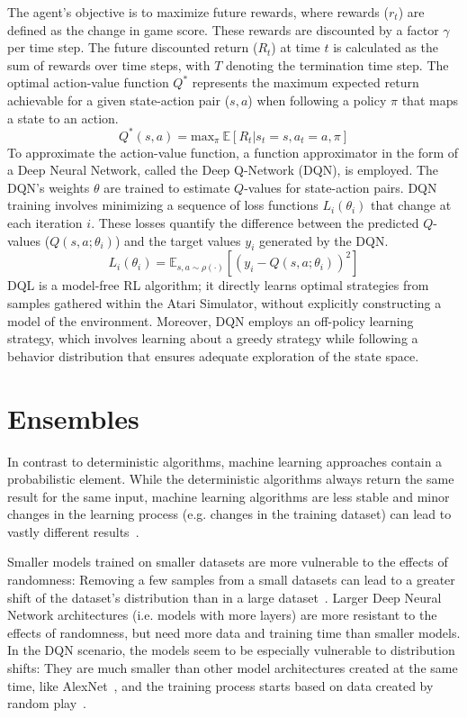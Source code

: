 The agent's objective is to maximize future rewards, where rewards ($r_t$) are defined as the change in game score. These rewards are discounted by a factor $\gamma$ per time step. The future discounted return ($R_t$) at time $t$ is calculated as the sum of rewards over time steps, with $T$ denoting the termination time step. The optimal action-value function $Q^*$ represents the maximum expected return achievable for a given state-action pair ($s, a$) when following a policy $\pi$ that maps a state to an action.
$$Q^{*}(s, a) = \text{max}_{\pi}\ \mathbb{E}[ R_{t} | s_{t}= s, a_{t}=a, \pi]$$
To approximate the action-value function, a function approximator in the form of a Deep Neural Network, called the Deep Q-Network (DQN), is employed. The DQN's weights $\theta$ are trained to estimate $Q$-values for state-action pairs. DQN training involves minimizing a sequence of loss functions $L_i(\theta_i)$ that change at each iteration $i$. These losses quantify the difference between the predicted $Q$-values ($Q(s, a; \theta_i)$) and the target values $y_i$ generated by the DQN.
$$L_i\left(\theta_i\right)=\mathbb{E}_{s, a \sim \rho(\cdot)}\left[\left(y_i-Q\left(s, a ; \theta_i\right)\right)^2\right]$$
DQL is a model-free RL algorithm; it directly learns optimal strategies from samples gathered within the Atari Simulator, without explicitly constructing a model of the environment. Moreover, DQN employs an off-policy learning strategy, which involves learning about a greedy strategy while following a behavior distribution that ensures adequate exploration of the state space.

\section{Ensembles}

In contrast to deterministic algorithms, machine learning approaches contain a probabilistic element. While the deterministic algorithms always return the same result for the same input, machine learning algorithms are less stable and minor changes in the learning process (e.g. changes in the training dataset) can lead to vastly different results~\parencite{breiman_bagging_1996}.

Smaller models trained on smaller datasets are more vulnerable to the effects of randomness: Removing a few samples from a small datasets can lead to a greater shift of the dataset's distribution than in a large dataset~\parencite{choromanska_loss_2015}. Larger Deep Neural Network architectures (i.e. models with more layers) are more resistant to the effects of randomness, but need more data and training time than smaller models. In the DQN scenario, the models seem to be especially vulnerable to distribution shifts: They are much smaller than other model architectures created at the same time, like AlexNet~\parencite{krizhevsky_imagenet_2012}, and the training process starts based on data created by random play~\parencite{mnih_playing_2013}.

